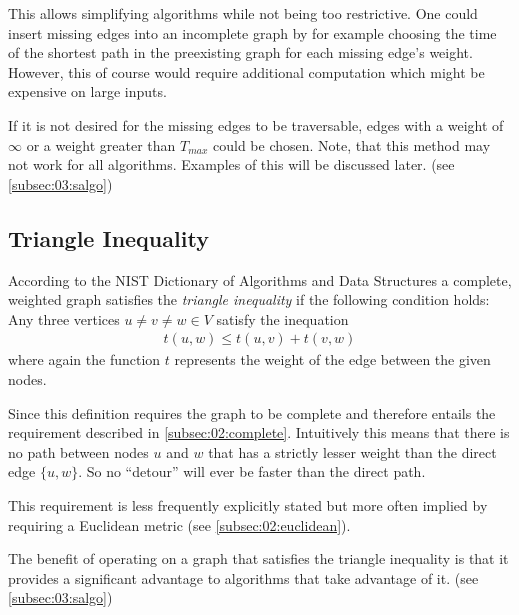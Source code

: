 This allows simplifying algorithms while not being too restrictive.
One could insert missing edges into an incomplete graph by for example choosing the time of the shortest path in the preexisting graph for each missing edge's weight.
However, this of course would require additional computation which might be expensive on large inputs.

If it is not desired for the missing edges to be traversable,
edges with a weight of $\infty$ or a weight greater than $T_{max}$ could be chosen.
Note, that this method may not work for all algorithms. Examples of this will be discussed later. (see \cref{subsec:03:salgo})

\subsection{Triangle Inequality}
\label{subsec:02:triangle}

According to the NIST Dictionary of Algorithms and Data Structures \cite{black_triangle_2004} a complete,
weighted graph satisfies the \emph{triangle inequality} if the following condition holds:
Any three vertices $u \neq v \neq w \in V$ satisfy the inequation
\begin{align*}
  t(u, w) \leq t(u, v) + t(v, w) 
\end{align*}
where again the function $t$ represents the weight of the edge between the given nodes.

Since this definition requires the graph to be complete and therefore entails the requirement described in \cref{subsec:02:complete}.
Intuitively this means that there is no path between nodes $u$ and $w$ that has a strictly lesser weight
than the direct edge $\{u, w\}$. So no \enquote{detour} will ever be faster than the direct path. 

This requirement is less frequently explicitly stated \cite{santini_hazardous_2022} but more often implied by requiring a Euclidean metric (see \cref{subsec:02:euclidean}).

The benefit of operating on a graph that satisfies the triangle inequality
is that it provides a significant advantage to algorithms that take advantage of it.
(see \cref{subsec:03:salgo}) 

